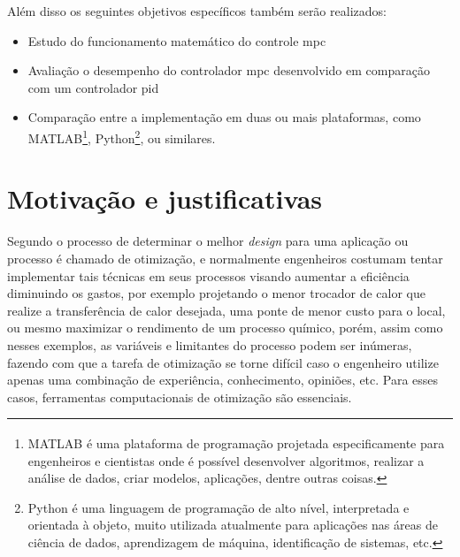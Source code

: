 Além disso os seguintes objetivos específicos também serão realizados:
\begin{itemize}
    \item Estudo do funcionamento matemático do controle \acrshort{mpc}
    \item Avaliação o desempenho do controlador \acrshort{mpc} desenvolvido em
        comparação com um controlador \acrshort{pid}
    \item Comparação entre a implementação em duas ou mais plataformas,
        como MATLAB\textsuperscript{\tiny\textregistered}\footnote{
            MATLAB\textsuperscript{\tiny\textregistered} é uma plataforma                           %
            de programação projetada especificamente para engenheiros e cientistas                  %
            onde é possível desenvolver algoritmos, realizar a análise de dados,                    %
            criar modelos, aplicações, dentre outras coisas.},                                      %
        Python\footnote{
            Python é uma linguagem de programação de alto nível,                                    %
            interpretada e orientada à objeto, muito utilizada atualmente para                      %
            aplicações nas áreas de ciência de dados, aprendizagem de máquina,                      %
            identificação de sistemas, etc.},                                                       %
        ou similares.
\end{itemize}

\section{Motivação e justificativas}
\label{sec:motivacao_e_justificativas}

Segundo  o processo de determinar o melhor \textit{design}
para uma aplicação ou processo é chamado de otimização, e normalmente engenheiros
costumam tentar implementar tais técnicas em seus processos visando aumentar a
eficiência diminuindo os gastos, por exemplo projetando o menor trocador de calor
que realize a transferência de calor desejada, uma ponte de menor custo para o local,
ou mesmo maximizar o rendimento de um processo químico, porém, assim como nesses
exemplos, as variáveis e limitantes do processo podem ser inúmeras, fazendo com que a
tarefa de otimização se torne difícil caso o engenheiro utilize apenas uma combinação
de experiência, conhecimento, opiniões, etc. Para esses casos, ferramentas
computacionais de otimização são essenciais.

